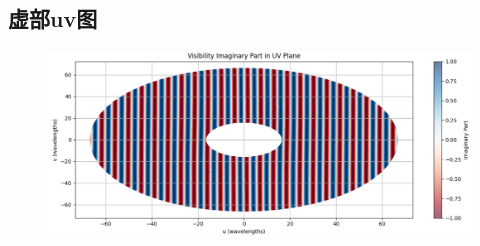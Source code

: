 \documentclass{article}
\begin{document}
\subsection{虚部uv图}
    \begin{figure}[htp]
    \centering
    \includegraphics[width=1\textwidth]{fig/image.png}
    \label{fig:image}
    \end{figure}
\end{document}
